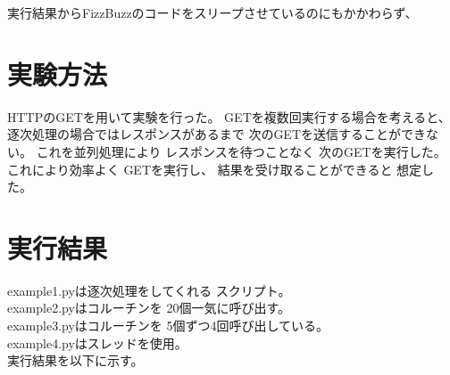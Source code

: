 \documentclass[14pt, oneside]{article}     	%
\begin{document}
実行結果からFizzBuzzのコードをスリープさせているのにもかかわらず、



\section{実験方法}

HTTPのGETを用いて実験を行った。
GETを複数回実行する場合を考えると、
逐次処理の場合ではレスポンスがあるまで
次のGETを送信することができない。
これを並列処理により
レスポンスを待つことなく
次のGETを実行した。
これにより効率よく
GETを実行し、
結果を受け取ることができると
想定した。









\section{実行結果}

example1.pyは逐次処理をしてくれる
スクリプト。\\
example2.pyはコルーチンを
20個一気に呼び出す。\\
example3.pyはコルーチンを
5個ずつ4回呼び出している。\\
example4.pyはスレッドを使用。\\


実行結果を以下に示す。








\end{document}

